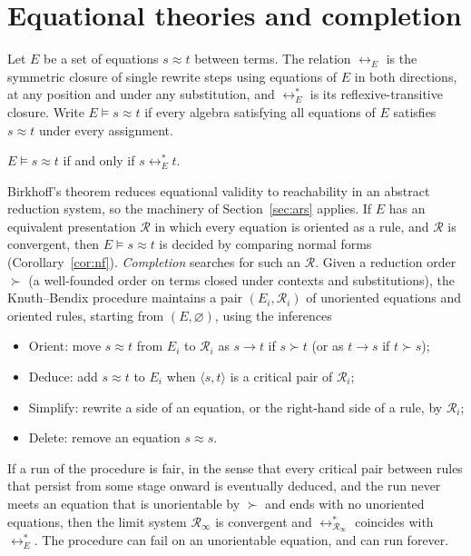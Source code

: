 \section{Equational theories and completion}
\label{sec:completion}

Let $E$ be a set of equations $s\approx t$ between terms. The relation $\leftrightarrow_E$ is the symmetric closure of single rewrite steps using equations of $E$ in both directions, at any position and under any substitution, and $\leftrightarrow_E^{*}$ is its reflexive-transitive closure. Write $E\models s\approx t$ if every algebra satisfying all equations of $E$ satisfies $s\approx t$ under every assignment.

\begin{theorem}[Birkhoff 1935]
\label{thm:birkhoff}
 $E\models s\approx t$ if and only if $s\leftrightarrow_E^{*}t$.
\end{theorem}

Birkhoff's theorem reduces equational validity to reachability in an abstract reduction system, so the machinery of Section~\ref{sec:ars} applies. If $E$ has an equivalent presentation $\mathcal{R}$ in which every equation is oriented as a rule, and $\mathcal{R}$ is convergent, then $E\models s\approx t$ is decided by comparing normal forms (Corollary~\ref{cor:nf}). \emph{Completion} searches for such an $\mathcal{R}$. Given a reduction order $\succ$ (a well-founded order on terms closed under contexts and substitutions), the Knuth--Bendix procedure maintains a pair $(E_i,\mathcal{R}_i)$ of unoriented equations and oriented rules, starting from $(E,\varnothing)$, using the inferences
\begin{itemize}[nosep]
\item \textsf{Orient}: move $s\approx t$ from $E_i$ to $\mathcal{R}_i$ as $s\to t$ if $s\succ t$ (or as $t\to s$ if $t\succ s$);
\item \textsf{Deduce}: add $s\approx t$ to $E_i$ when $\langle s,t\rangle$ is a critical pair of $\mathcal{R}_i$;
\item \textsf{Simplify}: rewrite a side of an equation, or the right-hand side of a rule, by $\mathcal{R}_i$;
\item \textsf{Delete}: remove an equation $s\approx s$.
\end{itemize}

\begin{theorem}
\label{thm:completion}
 If a run of the procedure is fair, in the sense that every critical pair between rules that persist from some stage onward is eventually deduced, and the run never meets an equation that is unorientable by $\succ$ and ends with no unoriented equations, then the limit system $\mathcal{R}_\infty$ is convergent and $\leftrightarrow_{\mathcal{R}_\infty}^{*}$ coincides with $\leftrightarrow_E^{*}$. The procedure can fail on an unorientable equation, and can run forever.
\end{theorem}

